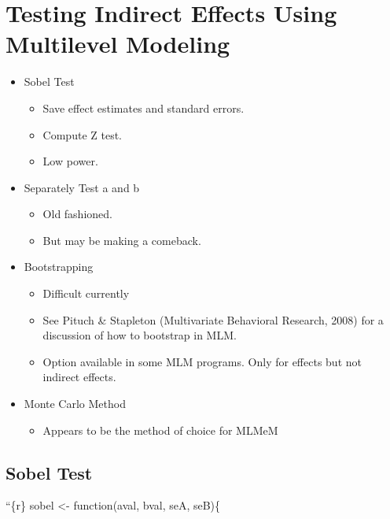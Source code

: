 \documentclass[
  english,
  man,floatsintext]{apa6}
\providecommand{\tightlist}{%
  \setlength{\itemsep}{0pt}\setlength{\parskip}{0pt}}
\begin{document}
\hypertarget{testing-indirect-effects-using-multilevel-modeling}{%
\section{Testing Indirect Effects Using Multilevel Modeling}\label{testing-indirect-effects-using-multilevel-modeling}}

\begin{itemize}
\tightlist
\item
  Sobel Test

  \begin{itemize}
  \tightlist
  \item
    Save effect estimates and standard errors.
  \item
    Compute Z test.
  \item
    Low power.
  \end{itemize}
\item
  Separately Test a and b

  \begin{itemize}
  \tightlist
  \item
    Old fashioned.
  \item
    But may be making a comeback.
  \end{itemize}
\item
  Bootstrapping

  \begin{itemize}
  \tightlist
  \item
    Difficult currently
  \item
    See Pituch \& Stapleton (Multivariate Behavioral Research, 2008) for a discussion of how to bootstrap in MLM.
  \item
    Option available in some MLM programs. Only for effects but not indirect effects.
  \end{itemize}
\item
  Monte Carlo Method

  \begin{itemize}
  \tightlist
  \item
    Appears to be the method of choice for MLMeM
  \end{itemize}
\end{itemize}

\hypertarget{sobel-test}{%
\subsection{Sobel Test}\label{sobel-test}}

``\{r\}
sobel \textless- function(aval, bval, seA, seB)\{
\end{document}
